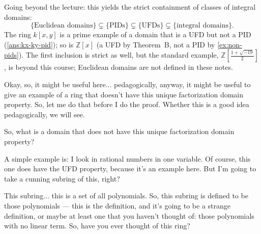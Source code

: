 \begin{content}

\begin{steps}
Going beyond the lecture: this yields the strict containment of classes of integral domains:
\[
\{\text{Euclidean domains}\} \subsetneq \{\text{PIDs}\} \subsetneq \{\text{UFDs}\} \subsetneq \{\text{integral domains}\}.
\]
The ring $k[x, y]$ is a prime example of a domain that is a UFD but not a PID (\cref{ans:kx-ky-pid}); so is $\mathbb{Z}[x]$ (a UFD by Theorem~B, not a PID by \cref{ex:non-pids}). The first inclusion is strict as well, but the standard example, $\mathbb{Z}[\frac{1 + \sqrt{-19}}{2}]$, is beyond this course; Euclidean domains are not defined in these notes.
\end{steps}
\end{content}

\begin{speech}[00:22:15 - 00:23:45]
Okay, so, it might be useful here... pedagogically, anyway, it might be useful to give an example of a ring that doesn't have this unique factorization domain property. So, let me do that before I do the proof. Whether this is a good idea pedagogically, we will see.

So, what is a domain  that does not have this unique factorization domain property? 

A simple example is: I look in rational numbers  in one variable. Of course, this one does have the UFD property, because it's an example here. But I'm going to take a cunning subring of this,  right?

This subring... this is a set of all polynomials. So, this subring is defined to be those polynomials --- this is the definition,  and it's going to be a strange definition, or maybe at least one that you haven't thought of: those polynomials with no linear term.  So, have you ever thought of this ring?
\end{speech}

